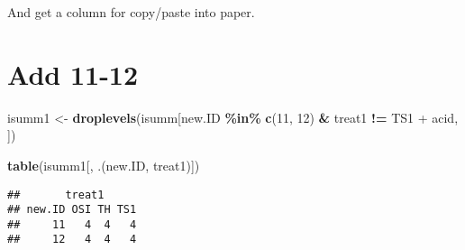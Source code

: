 \documentclass[
]{article}
\newenvironment{Shaded}{\begin{snugshade}}{\end{snugshade}}
\newcommand{\DecValTok}[1]{\textcolor[rgb]{0.00,0.00,0.81}{#1}}
\newcommand{\FunctionTok}[1]{\textcolor[rgb]{0.13,0.29,0.53}{\textbf{#1}}}
\newcommand{\NormalTok}[1]{#1}
\newcommand{\OtherTok}[1]{\textcolor[rgb]{0.56,0.35,0.01}{#1}}
\newcommand{\SpecialCharTok}[1]{\textcolor[rgb]{0.81,0.36,0.00}{\textbf{#1}}}
\newcommand{\StringTok}[1]{\textcolor[rgb]{0.31,0.60,0.02}{#1}}
\begin{document}
\begin{Shaded}
\end{Shaded}

And get a column for copy/paste into paper.

\begin{Shaded}
\end{Shaded}

\section{Add 11-12}\label{add-11-12}

\begin{Shaded}
\begin{Highlighting}[]
\NormalTok{isumm1 }\OtherTok{\textless{}{-}} \FunctionTok{droplevels}\NormalTok{(isumm[new.ID }\SpecialCharTok{\%in\%} \FunctionTok{c}\NormalTok{(}\StringTok{\textquotesingle{}11\textquotesingle{}}\NormalTok{, }\StringTok{\textquotesingle{}12\textquotesingle{}}\NormalTok{) }\SpecialCharTok{\&}\NormalTok{ treat1 }\SpecialCharTok{!=} \StringTok{\textquotesingle{}TS1 + acid\textquotesingle{}}\NormalTok{, ])}
\end{Highlighting}
\end{Shaded}

\begin{Shaded}
\begin{Highlighting}[]
\FunctionTok{table}\NormalTok{(isumm1[, .(new.ID, treat1)])}
\end{Highlighting}
\end{Shaded}

\begin{verbatim}
##       treat1
## new.ID OSI TH TS1
##     11   4  4   4
##     12   4  4   4
\end{verbatim}
\end{document}
